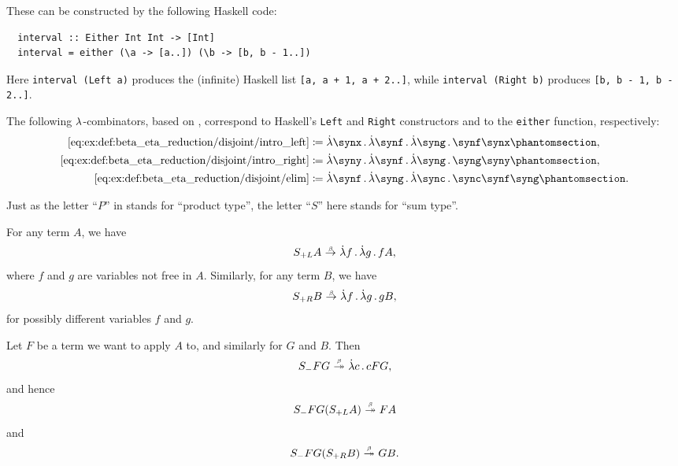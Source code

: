 \begin{example}
\begin{thmenum}
    These can be constructed by the following Haskell code:
    \begin{verbatim}
  interval :: Either Int Int -> [Int]
  interval = either (\a -> [a..]) (\b -> [b, b - 1..])
    \end{verbatim}\vspace{-\baselineskip}

    Here \verb|interval (Left a)| produces the (infinite) Haskell list \verb|[a, a + 1, a + 2..]|, while \verb|interval (Right b)| produces \verb|[b, b - 1, b - 2..]|.

    The following \( {\mathrm \lambda} \)-combinators, based on \cite{MathOF:product_type_in_simply_typed_lambda_terms}, correspond to Haskell's \verb|Left| and \verb|Right| constructors and to the \verb|either| function, respectively:
    \begin{align*}
      \ref{eq:ex:def:beta_eta_reduction/disjoint/intro_left}  &\coloneqq \qabs \synx \qabs \synf \qabs \syng \synf \synx       \taglabel[\ensuremath{ S_{+L} }]{eq:ex:def:beta_eta_reduction/disjoint/intro_left}, \\
      \ref{eq:ex:def:beta_eta_reduction/disjoint/intro_right} &\coloneqq \qabs \syny \qabs \synf \qabs \syng \syng \syny       \taglabel[\ensuremath{ S_{+R} }]{eq:ex:def:beta_eta_reduction/disjoint/intro_right}, \\
      \ref{eq:ex:def:beta_eta_reduction/disjoint/elim}        &\coloneqq \qabs \synf \qabs \syng \qabs \sync \sync \synf \syng \taglabel[\ensuremath{ S_- }]{eq:ex:def:beta_eta_reduction/disjoint/elim}.
    \end{align*}

    Just as the letter \enquote{\( P \)} in  stands for \enquote{product type}, the letter \enquote{\( S \)} here stands for \enquote{sum type}.

    For any term \( A \), we have
    \begin{equation*}
      S_{+L} A \bred \qabs f \qabs g f A,
    \end{equation*}
    where \( f \) and \( g \) are variables not free in \( A \). Similarly, for any term \( B \), we have
    \begin{equation*}
      S_{+R} B \bred \qabs f \qabs g g B,
    \end{equation*}
    for possibly different variables \( f \) and \( g \).

    Let \( F \) be a term we want to apply \( A \) to, and similarly for \( G \) and \( B \). Then
    \begin{equation*}
      S_- F G \bred* \qabs c c F G,
    \end{equation*}
    and hence
    \begin{equation*}
      S_- F G (S_{+L} A) \bred* F A
    \end{equation*}
    and
    \begin{equation*}
      S_- F G (S_{+R} B) \bred* G B.
    \end{equation*}


\end{thmenum}
\end{example}
